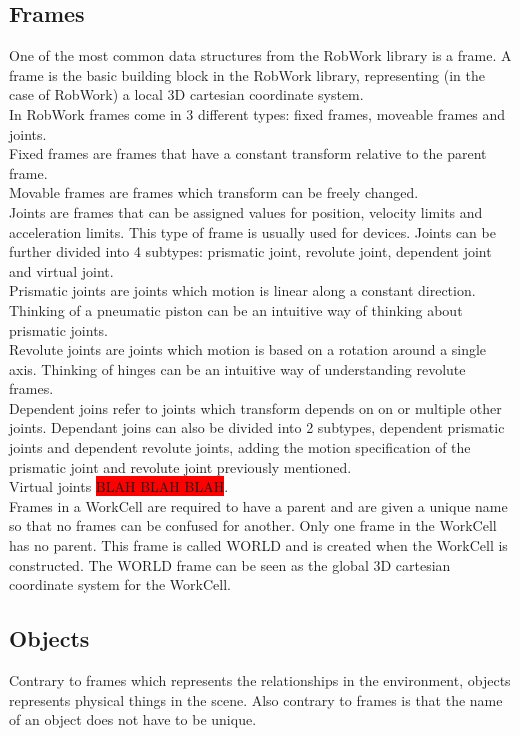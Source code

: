 \subsection{Frames}
One of the most common data structures from the RobWork library is a frame. A frame is the basic building block in the RobWork library, representing (in the case of RobWork) a local 3D cartesian coordinate system.\\

In RobWork frames come in 3 different types: fixed frames, moveable frames and joints.\\
Fixed frames are frames that have a constant transform relative to the parent frame.\\
Movable frames are frames which transform can be freely changed.\\
Joints are frames that can be assigned values for position, velocity limits and acceleration limits. This type of frame is usually used for devices. Joints can be further divided into 4 subtypes: prismatic joint, revolute joint, dependent joint and virtual joint.\\
Prismatic joints are joints which motion is linear along a constant direction. Thinking of a pneumatic piston can be an intuitive way of thinking about prismatic joints.\\
Revolute joints are joints which motion is based on a rotation around a single axis. Thinking of hinges can be an intuitive way of understanding revolute frames.\\
Dependent joins refer to joints which transform depends on on or multiple other joints. Dependant joins can also be divided into 2 subtypes, dependent prismatic joints and dependent revolute joints, adding the motion specification of the prismatic joint and revolute joint previously mentioned.\\
Virtual joints \colorbox{red}{BLAH BLAH BLAH}.\\

Frames in a WorkCell are required to have a parent and are given a unique name so that no frames can be confused for another. Only one frame in the WorkCell has no parent. This frame is called WORLD and is created when the WorkCell is constructed. The WORLD frame can be seen as the global 3D cartesian coordinate system for the WorkCell.


\subsection{Objects}
Contrary to frames which represents the relationships in the environment, objects represents physical things in the scene. Also contrary to frames is that the name of an object does not have to be unique.\\

